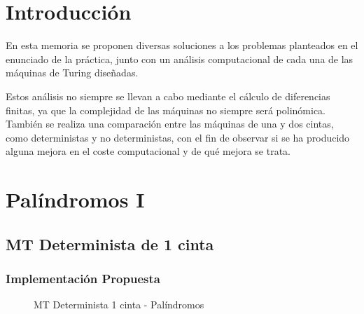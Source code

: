 \documentclass{uc3mpracticas}
\begin{document}
  \frontmatter



  \vspace{55mm}


  \newpage

  \tableofcontents

\newpage

  \mainmatter


  \section{Introducción}

  En esta memoria se proponen diversas soluciones a los problemas planteados en el enunciado de la práctica, junto con un análisis computacional de cada una de las máquinas de Turing diseñadas.

  \vspace{2mm}

  Estos análisis no siempre se llevan a cabo mediante el cálculo de diferencias finitas, ya que la complejidad de las máquinas no siempre será polinómica. También se realiza una comparación entre las máquinas de una y dos cintas, como deterministas y no deterministas, con el fin de observar si se ha producido alguna mejora en el coste computacional y de qué mejora se trata.


  \newpage

  \section{Palíndromos I}

  \subsection{MT Determinista de 1 cinta}


  \subsubsection{Implementación Propuesta}

  \begin{figure}[!h]
    \caption{MT Determinista 1 cinta - Palíndromos}
  \end{figure}
\end{document}
